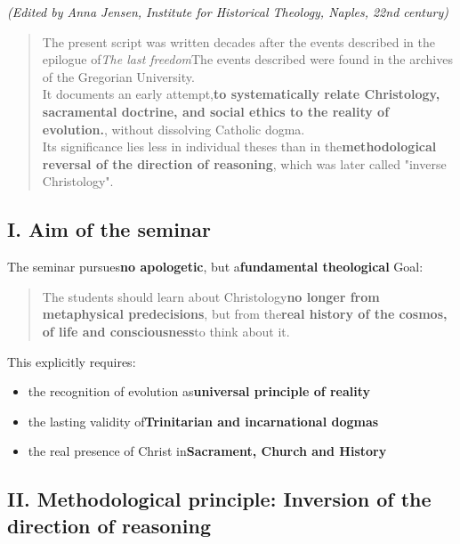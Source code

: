 \documentclass[
]{article}
\begin{document}
\emph{(Edited by Anna Jensen, Institute for Historical Theology, Naples, 22nd century)}

\begin{quote}
The present script was written decades after the events described in the epilogue of\emph{The last freedom}The events described were found in the archives of the Gregorian University.\\
It documents an early attempt,\textbf{to systematically relate Christology, sacramental doctrine, and social ethics to the reality of evolution.}, without dissolving Catholic dogma.\\
Its significance lies less in individual theses than in the\textbf{methodological reversal of the direction of reasoning}, which was later called "inverse Christology".
\end{quote}

\subsection{\texorpdfstring{\textbf{I. Aim of the seminar}}{I. Aim of the seminar}}\label{i.-aim-of-the-seminar}

The seminar pursues\textbf{no apologetic}, but a\textbf{fundamental theological} Goal:

\begin{quote}
The students should learn about Christology\textbf{no longer from metaphysical predecisions}, but from the\textbf{real history of the cosmos, of life and consciousness}to think about it.
\end{quote}

This explicitly requires:

\begin{itemize}
\item
  the recognition of evolution as\textbf{universal principle of reality}
\item
  the lasting validity of\textbf{Trinitarian and incarnational dogmas}
\item
  the real presence of Christ in\textbf{Sacrament, Church and History}
\end{itemize}

\subsection{\texorpdfstring{\textbf{II. Methodological principle: Inversion of the direction of reasoning}}{II. Methodological principle: Inversion of the direction of reasoning}}\label{ii.-methodological-principle-inversion-of-the-direction-of-reasoning}
\end{document}

